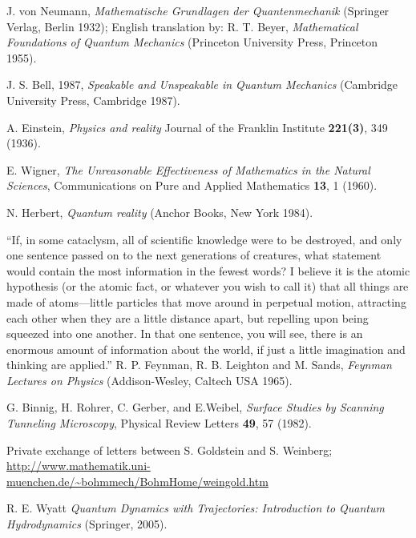 \documentclass[nofootinbib, secnumarabic, amsmath, nobibnotes,10pt,aps,pra]{revtex4-1}
\begin{document}
\begin{thebibliography}{999}

J. von Neumann, \emph{Mathematische Grundlagen der Quantenmechanik} (Springer Verlag, Berlin 1932); English translation by: R. T. Beyer, \emph{Mathematical Foundations of Quantum Mechanics} (Princeton University Press, Princeton 1955).

J. S. Bell, 1987, \emph{Speakable and Unspeakable in Quantum Mechanics} (Cambridge University Press, Cambridge 1987).

 A. Einstein, \emph{Physics and reality} Journal of the Franklin Institute \textbf{221(3)},  349 (1936). 

 E. Wigner, \emph{The Unreasonable Effectiveness of Mathematics in the Natural Sciences}, Communications on Pure and Applied Mathematics \textbf{13},  1  (1960). 

 N. Herbert, \emph{Quantum reality} (Anchor Books, New York 1984).

 ``If, in some cataclysm, all of scientific knowledge were to be destroyed, and only one sentence passed on to the next generations of creatures, what statement would contain the most information in the fewest words? I believe it is the atomic hypothesis (or the atomic fact, or whatever you wish to call it) that all things are made of atoms---little particles that move around in perpetual motion, attracting each other when they are a little distance apart, but repelling upon being squeezed into one another. In that one sentence, you will see, there is an enormous amount of information about the world, if just a little imagination and thinking are applied.'' R. P. Feynman, R. B. Leighton and M. Sands, \emph{Feynman Lectures on Physics} (Addison-Wesley, Caltech USA 1965). 

 G. Binnig, H. Rohrer, C. Gerber, and E.Weibel, \emph{Surface Studies by Scanning Tunneling Microscopy}, Physical Review Letters  \textbf{49},    57 (1982).  

Private exchange of letters between S. Goldstein and S. Weinberg; \url{http://www.mathematik.uni-muenchen.de/~bohmmech/BohmHome/weingold.htm}

R. E. Wyatt \emph{Quantum Dynamics with Trajectories: Introduction to Quantum Hydrodynamics} (Springer, 2005).


\end{thebibliography}
\end{document}
